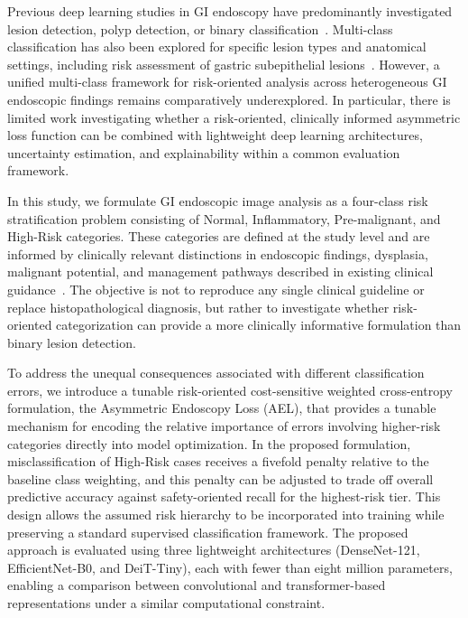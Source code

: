 \documentclass[11pt,a4paper]{article}
\begin{document}
Previous deep learning studies in GI endoscopy have predominantly investigated lesion detection, polyp detection, or binary classification~\citep{Tajbakhsh2016,Ahmad2021}. Multi-class classification has also been explored for specific lesion types and anatomical settings, including risk assessment of gastric subepithelial lesions~\citep{Ebigbo2019}. However, a unified multi-class framework for risk-oriented analysis across heterogeneous GI endoscopic findings remains comparatively underexplored. In particular, there is limited work investigating whether a risk-oriented, clinically informed asymmetric loss function can be combined with lightweight deep learning architectures, uncertainty estimation, and explainability within a common evaluation framework.

In this study, we formulate GI endoscopic image analysis as a four-class risk stratification problem consisting of Normal, Inflammatory, Pre-malignant, and High-Risk categories. These categories are defined at the study level and are informed by clinically relevant distinctions in endoscopic findings, dysplasia, malignant potential, and management pathways described in existing clinical guidance~\citep{Shaukat2021,Ferlitsch2017}. The objective is not to reproduce any single clinical guideline or replace histopathological diagnosis, but rather to investigate whether risk-oriented categorization can provide a more clinically informative formulation than binary lesion detection.

To address the unequal consequences associated with different classification errors, we introduce a tunable risk-oriented cost-sensitive weighted cross-entropy formulation, the Asymmetric Endoscopy Loss (AEL), that provides a tunable mechanism for encoding the relative importance of errors involving higher-risk categories directly into model optimization. In the proposed formulation, misclassification of High-Risk cases receives a fivefold penalty relative to the baseline class weighting, and this penalty can be adjusted to trade off overall predictive accuracy against safety-oriented recall for the highest-risk tier. This design allows the assumed risk hierarchy to be incorporated into training while preserving a standard supervised classification framework. The proposed approach is evaluated using three lightweight architectures (DenseNet-121, EfficientNet-B0, and DeiT-Tiny), each with fewer than eight million parameters, enabling a comparison between convolutional and transformer-based representations under a similar computational constraint.
\end{document}
